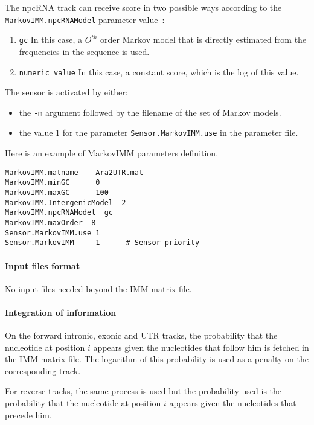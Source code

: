 The npcRNA track can receive score in two  possible ways
according to the \texttt{MarkovIMM.npcRNAModel} parameter value~:
\begin{enumerate}
\item  \texttt{gc} In this case, a $O^{th}$ order Markov model that is directly
  estimated from the frequencies in the sequence is used.
\item \texttt{numeric value} In this case, a constant score, which is the log of this value.
\end{enumerate}

The sensor is activated by either:
\begin{itemize}
\item the \texttt{-m} argument followed by the filename of the set of Markov models.
\item the value 1 for the parameter \texttt{Sensor.MarkovIMM.use} in
  the parameter file.
\end{itemize}

Here is an example of MarkovIMM parameters definition.
\begin{Verbatim}[fontsize=\small]
MarkovIMM.matname    Ara2UTR.mat
MarkovIMM.minGC      0
MarkovIMM.maxGC      100
MarkovIMM.IntergenicModel  2
MarkovIMM.npcRNAModel  gc
MarkovIMM.maxOrder  8
Sensor.MarkovIMM.use 1
Sensor.MarkovIMM     1      # Sensor priority
\end{Verbatim}


\paragraph{Input files format}

No input files needed beyond the IMM matrix file. 

\paragraph{Integration of information}

On the forward intronic, exonic and UTR tracks, the probability that
the nucleotide at position $i$ appears given the nucleotides that
follow him is fetched in the IMM matrix file. The logarithm of this
probability is used as a penalty on the corresponding track.

For reverse tracks, the same process is used but the probability used
is the probability that the nucleotide at position $i$ appears given
the nucleotides that precede him.


